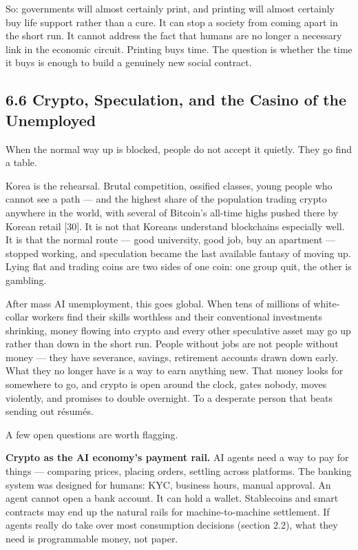 \documentclass[11pt,a4paper]{article}
\begin{document}
So: governments will almost certainly print, and printing will almost certainly buy life support rather than a cure. It can stop a society from coming apart in the short run. It cannot address the fact that humans are no longer a necessary link in the economic circuit. Printing buys time. The question is whether the time it buys is enough to build a genuinely new social contract.

\subsection{6.6 Crypto, Speculation, and the Casino of the Unemployed}

When the normal way up is blocked, people do not accept it quietly. They go find a table.

Korea is the rehearsal. Brutal competition, ossified classes, young people who cannot see a path --- and the highest share of the population trading crypto anywhere in the world, with several of Bitcoin's all-time highs pushed there by Korean retail [30]. It is not that Koreans understand blockchains especially well. It is that the normal route --- good university, good job, buy an apartment --- stopped working, and speculation became the last available fantasy of moving up. Lying flat and trading coins are two sides of one coin: one group quit, the other is gambling.

After mass AI unemployment, this goes global. When tens of millions of white-collar workers find their skills worthless and their conventional investments shrinking, money flowing into crypto and every other speculative asset may go up rather than down in the short run. People without jobs are not people without money --- they have severance, savings, retirement accounts drawn down early. What they no longer have is a way to earn anything new. That money looks for somewhere to go, and crypto is open around the clock, gates nobody, moves violently, and promises to double overnight. To a desperate person that beats sending out résumés.

A few open questions are worth flagging.

\textbf{Crypto as the AI economy's payment rail.} AI agents need a way to pay for things --- comparing prices, placing orders, settling across platforms. The banking system was designed for humans: KYC, business hours, manual approval. An agent cannot open a bank account. It can hold a wallet. Stablecoins and smart contracts may end up the natural rails for machine-to-machine settlement. If agents really do take over most consumption decisions (section 2.2), what they need is programmable money, not paper.
\end{document}
